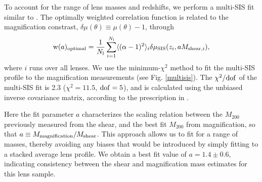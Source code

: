 To account for the range of lens masses and redshifts, we perform a multi-\ac{SIS} fit similar to \citet{Hildebrandt11}.  The optimally weighted correlation function is related to the magnification constrast, $\delta\mu(\theta) \equiv \mu(\theta) -1$, through
\begin{equation}
\mathrm{w}(a)_{\rm optimal}= \frac{1}{N_{\rm l}}\sum_{i=1}^{N_{\rm l}} \langle (\alpha -1)^2 \rangle_i \delta \mu_{\rm SIS} (z_i, aM_{{\rm shear},i}),
\end{equation}
where $i$ runs over all lenses. We use the minimum-$\chi^2$ method to fit the multi-\ac{SIS} profile to the magnification measurements (see Fig. \ref{multisis}). The $\chi^2/{\rm dof}$ of the multi-\ac{SIS} fit is 2.3 ($\chi^2=11.5$, ${\rm dof}=5$), and is calculated using the unbiased inverse covariance matrix, according to the prescription in \citet{Hartlap07}.

Here the fit parameter $a$ characterizes the scaling relation between the $M_{200}$ previously measured from the shear, and the best fit $M_{200}$ from magnification, so that $a \equiv M_{\rm magnification}/M_{\rm shear}$. This approach allows us to fit for a range of masses, thereby avoiding any biases that would be introduced by simply fitting to a stacked average lens profile.  We obtain a best fit value of $a=1.4 \pm 0.6$, indicating consistency between the shear and magnification mass estimates for this lens sample.


